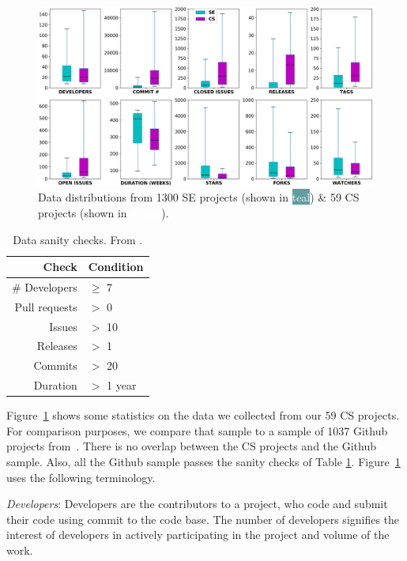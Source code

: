 \documentclass[sigconf,review,anonymous]{acmart}
\begin{document}
\begin{figure}[!t]
\vspace{5pt}
\centering \includegraphics[width=.975\linewidth]{img/Figure_1.png}
\caption{Data distributions from 1300 SE projects (shown in \colorbox{cadetblue}{ \textcolor{white}{teal}}) \& 59 CS projects (shown in \colorbox{amethyst}{ \textcolor{white}{purple}}).}\label{fig:comparison}
\end{figure}    


\begin{table}
\caption{Data sanity checks. From \cite{Kalliamvakou:2014}.}\label{tbl:sanity}
\footnotesize
 
 \begin{tabular}{r|l}
 Check   & Condition    \\\hline
 \# Developers & $\geq$ 7 \\
 Pull requests  & $>$ 0 \\
Issues & $>$ 10 \\
Releases &  $>$ 1 \\
Commits & $>$ 20 \\
Duration  & $>$ 1 year 
\end{tabular}%
 
\end{table}
Figure~\ref{fig:comparison} shows some statistics on the data we collected from our 59 CS projects. For comparison purposes, we compare that sample to 
a sample of 1037 Github projects from~\cite{Majumder19}.
There is no overlap between the CS projects and the Github sample. Also, all the Github
sample passes the sanity checks of Table \ref{tbl:sanity}. Figure~\ref{fig:comparison} uses the following terminology.


\textit{Developers}: Developers are the contributors to a project, who code and submit their code using commit to the code base. The number of developers signifies the interest of developers in actively participating in the project and volume of the work.
  
\end{document}
